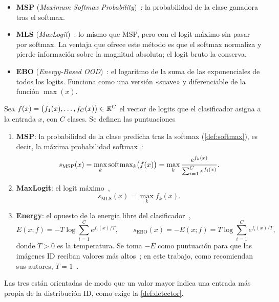 \begin{itemize}
  \item \textbf{MSP} (\emph{Maximum Softmax Probability})~\cite{hendrycks2017}: la probabilidad de la clase ganadora tras el softmax.
  \item \textbf{MLS} (\emph{MaxLogit})~\cite{hendrycks2022}: lo mismo que MSP, pero con el logit máximo sin pasar por softmax. La ventaja que ofrece este método es que el softmax normaliza y pierde información sobre la magnitud absoluta; el logit bruto la conserva.
  \item \textbf{EBO} (\emph{Energy-Based OOD})~\cite{liu2020energy}: el logaritmo de la suma de las exponenciales de todos los logits. Funciona como una versión «suave» y diferenciable de la función $\max(x)$.
\end{itemize}
\begin{definicion}\label{def:logits}
Sea $f(x) = \bigl(f_1(x), \dots, f_C(x)\bigr) \in \mathbb{R}^C$ el vector de logits que el clasificador asigna a la entrada $x$, con $C$ clases. Se definen las puntuaciones
\begin{enumerate}
  \item \textbf{MSP}: la probabilidad de la clase predicha tras la softmax (\cref{def:softmax}), es decir, la máxima probabilidad softmax~\cite[sec.~3]{hendrycks2017}:
  \[
    s_{\mathrm{MSP}}(x) = \max_{k} \operatorname{softmax}_k\bigl(f(x)\bigr) = \max_{k} \frac{e^{f_k(x)}}{\sum_{i=1}^{C} e^{f_i(x)}}.
  \]
  \item \textbf{MaxLogit}: el logit máximo~\cite{hendrycks2022},
  \[
    s_{\mathrm{MLS}}(x) = \max_{k} f_k(x).
  \]
  \item \textbf{Energy}: el opuesto de la energía libre del clasificador~\cite[ec.~(4)]{liu2020energy},
  \[
    E(x; f) = -T \log \sum_{i=1}^{C} e^{f_i(x)/T}, \qquad
    s_{\mathrm{EBO}}(x) = -E(x; f) = T \log \sum_{i=1}^{C} e^{f_i(x)/T},
  \]
  donde $T > 0$ es la temperatura. Se toma $-E$ como puntuación para que las imágenes ID reciban valores más altos~\cite[sec.~3.1, ec.~(7)]{liu2020energy}; en este trabajo, como recomiendan sus autores, $T = 1$~\cite[sec.~4]{liu2020energy}.
\end{enumerate}
Las tres están orientadas de modo que un valor mayor indica una entrada más propia de la distribución ID, como exige la \cref{def:detector}.
\end{definicion}

